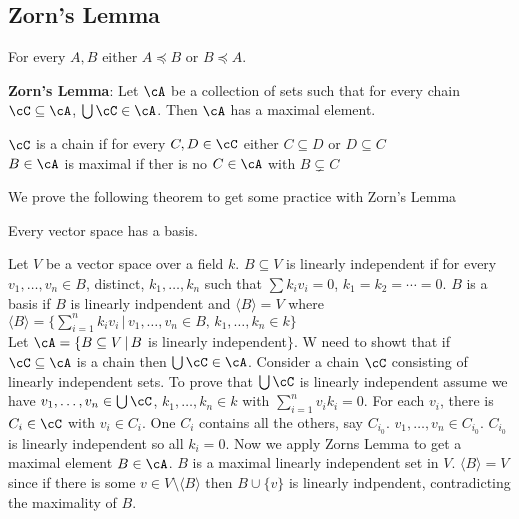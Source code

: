 
\subsection{Zorn's Lemma}

\begin{theorem}
    For every $A , B$ either $A \preceq B$ or $B \preceq A$.
\end{theorem}

\textbf{Zorn's Lemma}: Let $\cA$ be a collection of sets such that for every chain $\cC \subseteq \cA$, $\bigcup \cC \in \cA$. Then $\cA$ has a maximal element. 

\begin{definition}
    $\cC$ is a chain if for every $C, D \in \cC$ either $C \subseteq D$ or $D \subseteq C$ \\
    $B \in \cA$ is maximal if ther is no $C \in \cA$ with $B \subsetneq C$ 
\end{definition}

\noindent
We prove the following theorem to get some practice with Zorn's Lemma

\begin{theorem}
    Every vector space has a basis.
\end{theorem}

\begin{pf}
    Let $V$ be a vector space over a field $k$. $B \subseteq V$ is linearly independent if for every $v_1, \ldots, v_n \in B$, distinct, $k_1, \ldots, k_n$ such that $\sum k_iv_i = 0$, $k_1 = k_2 = \cdots = 0$. $B$ is a basis if $B$ is linearly indpendent and $\langle B \rangle = V$ where $\langle B \rangle = \{\sum_{i=1}^n k_iv_i \, | \, v_1, \ldots, v_n \in B, \, k_1, \ldots, k_n \in k\}$ \\
    Let $\cA = \{B \subseteq V \, | \, B$ is linearly independent$\}$. W need to showt that if $\cC \subseteq \cA$ is a chain then $\bigcup \cC \in \cA$. Consider a chain $\cC$ consisting of linearly independent sets. To prove that $\bigcup \cC$ is linearly independent assume we have $v_1, \ldots, v_n \in \bigcup \cC$, $k_1, \ldots, k_n \in k$ with $\sum_{i=1}^n v_ik_i = 0$. For each $v_i$, there is $C_i \in \cC$ with $v_i \in C_i$. One $C_i$ contains all the others, say $C_{i_0}$. $v_1, \ldots, v_n \in C_{i_0}$. $C_{i_0}$ is linearly independent so all $k_i = 0$. Now we apply Zorns Lemma to get a maximal element $B \in \cA$. $B$ is a maximal linearly independent set in $V$. $\langle B \rangle = V$ since if there is some $v \in V \setminus \langle B \rangle$ then $B \cup \{v\}$ is linearly indpendent, contradicting the maximality of $B$. 
\end{pf}

